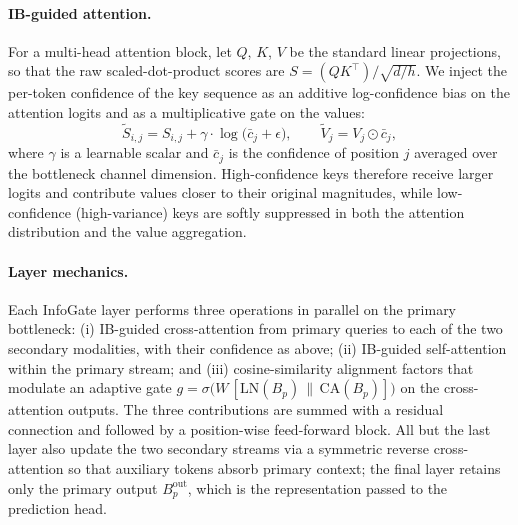 \paragraph{IB-guided attention.}
For a multi-head attention block, let $Q$, $K$, $V$ be the standard linear
projections, so that the raw scaled-dot-product scores are
$S = (Q K^{\top})/\sqrt{d/h}$. We inject the per-token confidence of the key
sequence as an additive log-confidence bias on the attention logits and as a
multiplicative gate on the values:
\begin{equation}
  \tilde{S}_{i,j}
    = S_{i,j} + \gamma \cdot \log\!\bigl(\bar{c}_j + \epsilon\bigr),
  \qquad
  \tilde{V}_j = V_j \odot \bar{c}_j,
\end{equation}
where $\gamma$ is a learnable scalar and $\bar{c}_j$ is the confidence of
position $j$ averaged over the bottleneck channel dimension.
High-confidence keys therefore receive larger logits and contribute values
closer to their original magnitudes, while low-confidence (high-variance)
keys are softly suppressed in both the attention distribution and the value
aggregation.

\paragraph{Layer mechanics.}
Each InfoGate layer performs three operations in parallel on the primary
bottleneck: (i) IB-guided cross-attention from primary queries to each of the
two secondary modalities, with their confidence as above; (ii) IB-guided
self-attention within the primary stream; and (iii) cosine-similarity
alignment factors that modulate an adaptive gate
$g = \sigma\bigl(W\,[\mathrm{LN}(B_p)\,\|\,\mathrm{CA}(B_p)]\bigr)$ on the
cross-attention outputs. The three contributions are summed with a residual
connection and followed by a position-wise feed-forward block. All but the
last layer also update the two secondary streams via a symmetric reverse
cross-attention so that auxiliary tokens absorb primary context; the final
layer retains only the primary output $B_p^{\mathrm{out}}$, which is the
representation passed to the prediction head.

